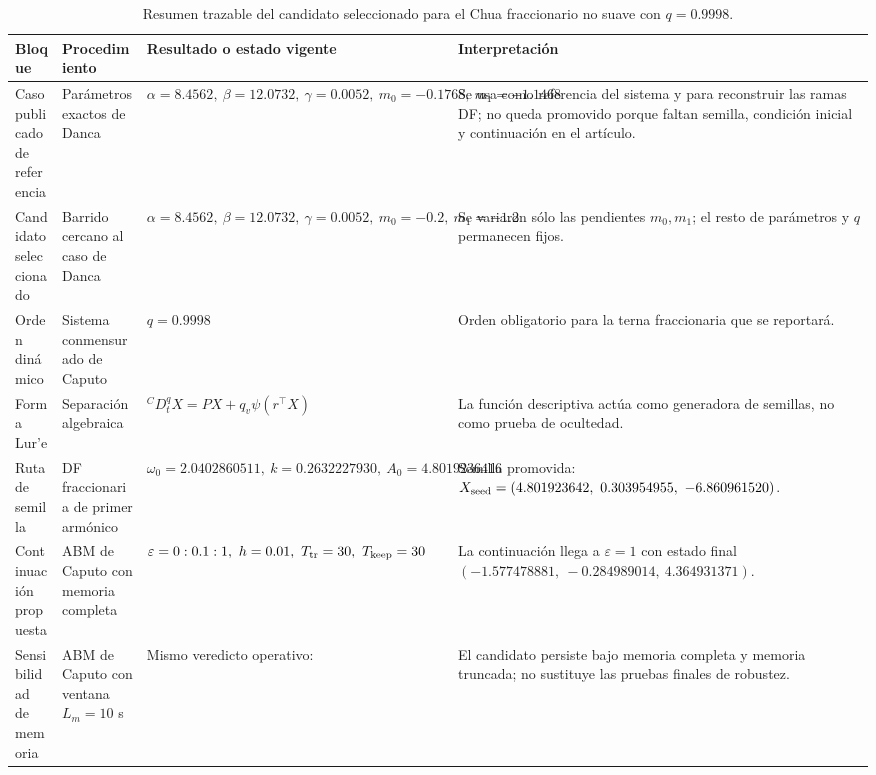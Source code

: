 \documentclass[journal]{IEEEtran}
\begin{document}
\begin{table}[htbp]
\centering
\scriptsize
\setlength{\tabcolsep}{3pt}
\renewcommand{\arraystretch}{1.12}
\caption{Resumen trazable del candidato seleccionado para el Chua fraccionario no suave con \(q=0.9998\).}
\label{tab:chua_frac_ns_results_full}
\begin{adjustbox}{max width=\textwidth}
\begin{tabular}{@{}L{2.7cm}L{3.4cm}L{4.4cm}L{5.8cm}@{}}
\toprule
\textbf{Bloque} &
\textbf{Procedimiento} &
\textbf{Resultado o estado vigente} &
\textbf{Interpretación} \\
\midrule

Caso publicado de referencia &
Parámetros exactos de Danca &
\(\alpha=8.4562,\ \beta=12.0732,\ \gamma=0.0052,\ m_0=-0.1768,\ m_1=-1.1468\) &
Se usa como referencia del sistema y para reconstruir las ramas DF; no queda promovido porque faltan semilla, condición inicial y continuación en el artículo. \\

Candidato seleccionado &
Barrido cercano al caso de Danca &
\(\alpha=8.4562,\ \beta=12.0732,\ \gamma=0.0052,\ m_0=-0.2,\ m_1=-1.2\) &
Se variaron sólo las pendientes \(m_0,m_1\); el resto de parámetros y \(q\) permanecen fijos. \\

Orden dinámico &
Sistema conmensurado de Caputo &
\(q=0.9998\) &
Orden obligatorio para la terna fraccionaria que se reportará. \\

Forma Lur'e &
Separación algebraica &
\({}^{C}D_t^qX=PX+q_v\psi(r^\top X)\) &
La función descriptiva actúa como generadora de semillas, no como prueba de ocultedad. \\

Ruta de semilla &
DF fraccionaria de primer armónico &
\(\omega_0=2.0402860511,\ k=0.2632227930,\ A_0=4.8019236416\) &
Semilla promovida: \(X_{\rm seed}=(4.801923642,\ 0.303954955,\ -6.860961520)\). \\

Continuación propuesta &
ABM de Caputo con memoria completa &
\(\varepsilon=0:0.1:1,\ h=0.01,\ T_{\rm tr}=30,\ T_{\rm keep}=30\) &
La continuación llega a \(\varepsilon=1\) con estado final \((-1.577478881,\ -0.284989014,\ 4.364931371)\). \\

Sensibilidad de memoria &
ABM de Caputo con ventana \(L_m=10\) s &
Mismo veredicto operativo:  &
El candidato persiste bajo memoria completa y memoria truncada; no sustituye las pruebas finales de robustez. \\


\end{tabular}
\end{adjustbox}
\end{table}
\end{document}
